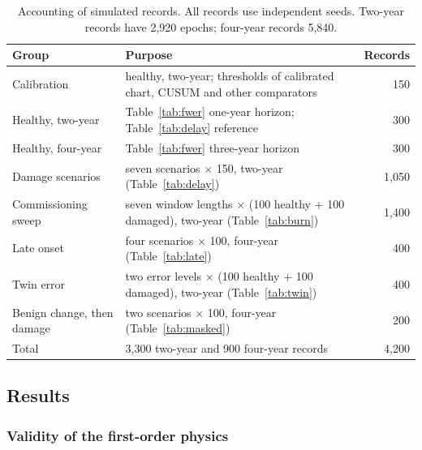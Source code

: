 \documentclass[12pt,a4paper]{article}
\newenvironment{revblock}{}{}
\newenvironment{revblock}{\begingroup\color{revcol}}{\endgroup}
\begin{document}
\begin{revblock}
\begin{table}[t]
\centering
\small
\caption{Accounting of simulated records. All records use independent seeds. Two-year records have 2{,}920 epochs; four-year records 5{,}840.}
\label{tab:accounting}
\begin{tabular}{p{3.0cm}p{9.6cm}r}
\toprule
Group & Purpose & Records \\
\midrule
Calibration & healthy, two-year; thresholds of calibrated chart, CUSUM and other comparators & 150 \\
Healthy, two-year & Table~\ref{tab:fwer} one-year horizon; Table~\ref{tab:delay} reference & 300 \\
Healthy, four-year & Table~\ref{tab:fwer} three-year horizon & 300 \\
Damage scenarios & seven scenarios $\times$ 150, two-year (Table~\ref{tab:delay}) & 1{,}050 \\
Commissioning sweep & seven window lengths $\times$ (100 healthy + 100 damaged), two-year (Table~\ref{tab:burn}) & 1{,}400 \\
Late onset & four scenarios $\times$ 100, four-year (Table~\ref{tab:late}) & 400 \\
Twin error & two error levels $\times$ (100 healthy + 100 damaged), two-year (Table~\ref{tab:twin}) & 400 \\
Benign change, then damage & two scenarios $\times$ 100, four-year (Table~\ref{tab:masked}) & 200 \\
\midrule
Total & 3{,}300 two-year and 900 four-year records & 4{,}200 \\
\bottomrule
\end{tabular}
\end{table}
\end{revblock}

\subsection{Results}\label{sec:sim-results}

\subsubsection{Validity of the first-order physics}
\end{document}
